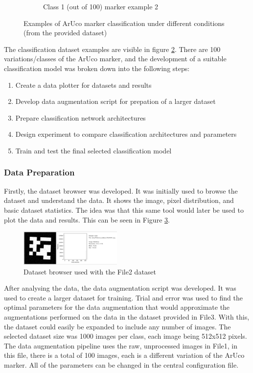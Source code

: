 \documentclass[conference]{IEEEtran}
\begin{document}
\begin{figure}[h]
\begin{subfigure}[b]{0.2\textwidth}
      \caption{Class 1 (out of 100) marker example 2}
      \label{fig:class_ex4}
  \end{subfigure}
  \caption{Examples of ArUco marker classification under different conditions (from the provided dataset)}
  \label{fig:classification_examples}
\end{figure}

The classification dataset examples are visible in figure \ref{fig:classification_examples}.
There are 100 variations/classes of the ArUco marker, and the development of a suitable classification model was broken down into the following steps:

\begin{enumerate}
  \item Create a data plotter for datasets and results
  \item Develop data augmentation script for prepation of a larger dataset  
  \item Prepare classification network architectures
  \item Design experiment to compare classification architectures and parameters
  \item Train and test the final selected classification model
\end{enumerate}

\subsubsection{Data Preparation}

Firstly, the dataset browser was developed. It was initially used to browse the dataset and understand the data. It shows the image, pixel distribution, and basic dataset statistics.
The idea was that this same tool would later be used to plot the data and results. This can be seen in Figure \ref{fig:data_browser_1}.

\begin{figure}[h]
  \centering
  \includegraphics[width=0.45\textwidth]{images/aruco-dataset-browser-1.png}
  \caption{Dataset browser used with the File2 dataset}
  \label{fig:data_browser_1}
\end{figure}

After analysing the data, the data augmentation script was developed. It was used to create a larger dataset for training.
Trial and error was used to find the optimal parameters for the data augmentation that would approximate the augmentations performed
on the data in the dataset provided in File3. With this, the dataset could easily be expanded to include any number of images. The selected
dataset size was 1000 images per class, each image being 512x512 pixels. The data augmentation pipeline uses the raw, unprocessed images in File1, in this file, 
there is a total of 100 images, each is a different variation of the ArUco marker. All of the parameters can be changed in the central configuration file.
\end{document}
